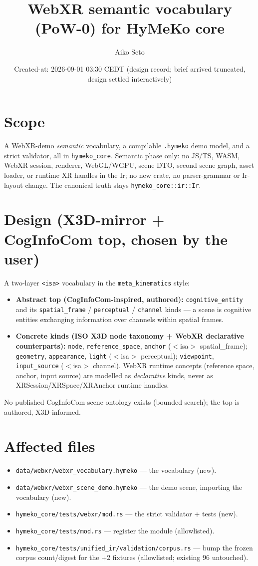 \documentclass[11pt]{article}
\title{WebXR semantic vocabulary (PoW-0) for HyMeKo core}
\author{Aiko Seto}
\date{Created-at: 2026-09-01 03:30 CEDT (design record; brief arrived truncated, design settled interactively)}
\begin{document}
\maketitle

\section*{Scope}
A WebXR-demo \emph{semantic} vocabulary, a compilable \texttt{.hymeko} demo model, and a strict
validator, all in \texttt{hymeko\_core}. Semantic phase only: no JS/TS, WASM, WebXR session, renderer,
WebGL/WGPU, scene DTO, second scene graph, asset loader, or runtime XR handles in the Ir; no new crate,
no parser-grammar or Ir-layout change. The canonical truth stays \texttt{hymeko\_core::ir::Ir}.

\section*{Design (X3D-mirror + CogInfoCom top, chosen by the user)}
A two-layer \texttt{<isa>} vocabulary in the \texttt{meta\_kinematics} style:
\begin{itemize}
  \item \textbf{Abstract top (CogInfoCom-inspired, authored):} \texttt{cognitive\_entity} and its
        \texttt{spatial\_frame} / \texttt{perceptual} / \texttt{channel} kinds --- a scene is cognitive
        entities exchanging information over channels within spatial frames.
  \item \textbf{Concrete kinds (ISO X3D node taxonomy + WebXR declarative counterparts):}
        \texttt{node}, \texttt{reference\_space}, \texttt{anchor} ($<$isa$>$ spatial\_frame);
        \texttt{geometry}, \texttt{appearance}, \texttt{light} ($<$isa$>$ perceptual);
        \texttt{viewpoint}, \texttt{input\_source} ($<$isa$>$ channel). WebXR runtime concepts
        (reference space, anchor, input source) are modelled as \emph{declarative} kinds, never as
        XRSession/XRSpace/XRAnchor runtime handles.
\end{itemize}
No published CogInfoCom scene ontology exists (bounded search); the top is authored, X3D-informed.

\section*{Affected files}
\begin{itemize}
  \item \texttt{data/webxr/webxr\_vocabulary.hymeko} --- the vocabulary (new).
  \item \texttt{data/webxr/webxr\_scene\_demo.hymeko} --- the demo scene, importing the vocabulary (new).
  \item \texttt{hymeko\_core/tests/webxr/mod.rs} --- the strict validator + tests (new).
  \item \texttt{hymeko\_core/tests/mod.rs} --- register the module (allowlisted).
  \item \texttt{hymeko\_core/tests/unified\_ir/validation/corpus.rs} --- bump the frozen corpus
        count/digest for the +2 fixtures (allowlisted; existing 96 untouched).
\end{itemize}
\end{document}
